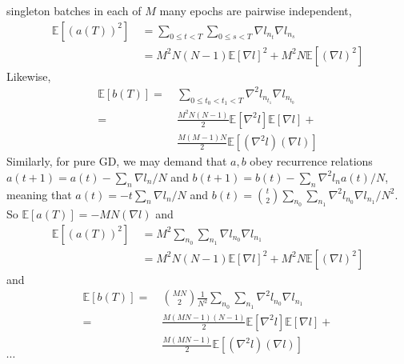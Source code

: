 \documentclass[final,12pt]{colt2021} %
\newcommand{\expct}[1]{\mathbb{E}\left[#1\right]}
\begin{document}
\begin{shaded}
                singleton batches in each of $M$ many epochs are pairwise
                independent,
                \begin{align*}
                    \expct{(a(T))^2}
                    ~&=
                    \sum_{0\leq t<T} \sum_{0\leq s<T} \nabla l_{n_t} \nabla l_{n_s} \\
                    ~&= 
                    M^2N(N-1)   \expct{\nabla l}^2 +
                    M^2N        \expct{(\nabla l)^2}
                \end{align*}
                Likewise, 
                \begin{align*}
                    \expct{b(T)}
                    = 
                    ~&\sum_{0\leq t_0 < t_1 < T} \nabla^2 l_{n_{t_1}} \nabla l_{n_{t_0}} \\
                    =
                    ~&\frac{M^2N(N-1)}{2} \expct{\nabla^2 l} \expct{\nabla l} + \\
                    ~&\frac{M(M-1)N}{2}  \expct{(\nabla^2 l) (\nabla l)} 
                \end{align*}
                Similarly, for pure GD, we may demand that $a, b$ obey recurrence
                relations $a(t+1) = a(t) - \sum_n \nabla l_n/N$ and
                $b(t+1) = b(t) - \sum_n \nabla^2 l_n a(t)/N$, meaning that
                $a(t) = -t \sum_n \nabla l_n/N$ and
                $b(t) = {t \choose 2} \sum_{n_0} \sum_{n_1} \nabla^2 l_{n_0} \nabla l_{n_1}/N^2$.
                So $\expct{a(T)} = -MN(\nabla l)$ and
                \begin{align*}
                    \expct{(a(T))^2}
                    ~&=
                    M^2 
                    \sum_{n_0} \sum_{n_1} \nabla l_{n_0} \nabla l_{n_1} \\
                    ~&= 
                    M^2 N(N-1)  \expct{\nabla l}^2 + 
                    M^2 N       \expct{(\nabla l)^2}
                \end{align*}
                and
                \begin{align*}
                    \expct{b(T)}
                    = 
                    ~&{MN \choose 2}\frac{1}{N^2}
                    \sum_{n_0} \sum_{n_1} \nabla^2 l_{n_0} \nabla l_{n_1} \\
                    =
                    ~&\frac{M(MN-1)(N-1)}{2} \expct{\nabla^2 l} \expct{\nabla l} + \\
                    ~&\frac{M(MN-1)}{2}      \expct{(\nabla^2 l) (\nabla l)} 
                \end{align*}
                $\cdots$
            \end{shaded}
\end{document}
